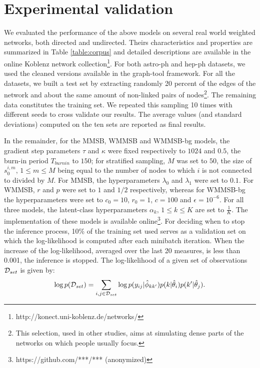 \section{Experimental validation}
\label{sec:exps}

We evaluated the performance of the above models on several real world weighted networks, both directed and undirected. Theirs characteristics and properties are summarized in Table \ref{table:corpus} and detailed descriptions are available in the online Koblenz network collection\footnote{http://konect.uni-koblenz.de/networks/}. For both astro-ph and hep-ph datasets, we used the cleaned versions available in the  graph-tool framework.
 For all the datasets, we built a test set by extracting randomly 20 percent of the edges of the network and about the same amount of non-linked pairs of nodes\footnote{This selection, used in other studies, aims at simulating dense parts of the networks on which people usually focus.}. The remaining data constitutes the training set. We repeated this sampling 10 times with different seeds to cross validate our results. The average values (and standard deviations) computed on the ten sets are reported as final results.

In the remainder, for the MMSB, WMMSB and WMMSB-bg models, the gradient step parameters  $\tau$ and $\kappa$ were fixed respectively to  $1024$ and $0.5$, the burn-in period $T_{burnin}$ to $150$; for stratified sampling, $M$ was set to $50$, the size of $s_0^{i,m}, \, 1 \le m \le M$ being equal to the number of nodes to which $i$ is not connected to divided by $M$. For MMSB, the hyperparameters $\lambda_0$ and $\lambda_1$ were set to $0.1$. For WMMSB, $r$ and $p$ were set to $1$ and $1/2$ respectively, whereas for WMMSB-bg the hyperparameters were set to  $c_0=10$, $r_0=1$, $c=100$ and $\epsilon=10^{-6}$. For all three models, the latent-class hyperparameters $\alpha_k, \, 1 \le k \le K$ are set to $\frac{1}{K}$. The implementation of these models is available online\footnote{https://github.com/***/*** (anonymized)}. For deciding when to stop the inference process, 10\% of the training set used serves as a validation set on which the log-likelihood is computed after each minibatch iteration. When the increase of the log-likelihood, averaged over the last 20 measures, is less than 0.001, the inference is stopped. The log-likelihood of a given set of observations $\mathcal{D}_{set}$  is given by:
%
\begin{equation*}
\log p(\mathcal{D}_{set}) = \sum_{i,j \in \mathcal{D}_{set}} \log p(y_{ij} | \hat\phi_{kk'}) p(k|\hat\theta_i) p(k'|\hat\theta_j).
\end{equation*}
%

